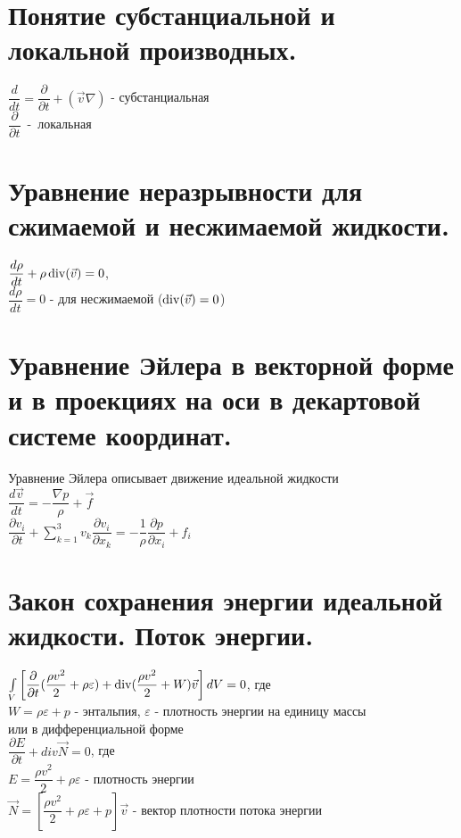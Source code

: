 \newcommand{\colontitulAutors}{edombek, astronom\_v\_cube и другие}
\newcommand{\colontitulYear}{2022}
\newcommand{\colontitulEducationalSubject}{МЕХАНИКА СПЛОШНЫХ СРЕД}
\newcommand{\colontitulTeacher}{С.~Н.~Гурбатов}



\newcommand{\sumk}{\sum\limits_{k=1}^3}


	\small
	\begin{multicols*}{2}
		\section{Понятие субстанциальной и локальной производных.}
		$\dfrac{d}{dt}=\dfrac{\partial}{\partial t}+(\vec{v}\nabla)$ - субстанциальная \\
		$\dfrac{\partial}{\partial t}$~-~локальная
		
		\section{Уравнение неразрывности для сжимаемой и несжимаемой жидкости.}
		$\dfrac{d\rho}{dt}+\rho \operatorname{div}(\vec{v})=0$, \\
		$\dfrac{d\rho}{dt}=0$ -  для несжимаемой ($\operatorname{div}(\vec{v})=0$)
		
		\section{Уравнение Эйлера в векторной форме и в проекциях на оси в декартовой системе координат.}
		Уравнение Эйлера описывает движение идеальной жидкости\\
		$\dfrac{d\vec{v}}{dt}=-\dfrac{\nabla p}{\rho}+\vec{f}$ \\
		$\dfrac{\partial v_i}{\partial t}+\sumk v_k\dfrac{\partial v_i}{\partial x_k}=-\dfrac{1}{\rho}\dfrac{\partial p}{\partial x_i}+f_i$
		
		\section{Закон сохранения энергии идеальной жидкости. Поток энергии.}
		$\int\limits_V\left[\dfrac{\partial}{\partial t}(\dfrac{\rho v^2}{2}+\rho\varepsilon)+\operatorname{div}(\dfrac{\rho v^2}{2}+W)\vec{v}\right]dV=0$, где\\
		$W=\rho\varepsilon+p$ - энтальпия, $\varepsilon$ - плотность энергии на единицу массы \\
		или в дифференциальной форме \\
		$\dfrac{\partial E}{\partial t}+div\vec{N}=0$, где \\
		$E=\dfrac{\rho v^2}{2}+\rho\varepsilon$ - плотность энергии \\
		$\vec{N}=\left[\dfrac{\rho v^2}{2}+\rho\varepsilon+p\right]\vec{v}$ - вектор плотности потока энергии
		

\end{multicols*}
